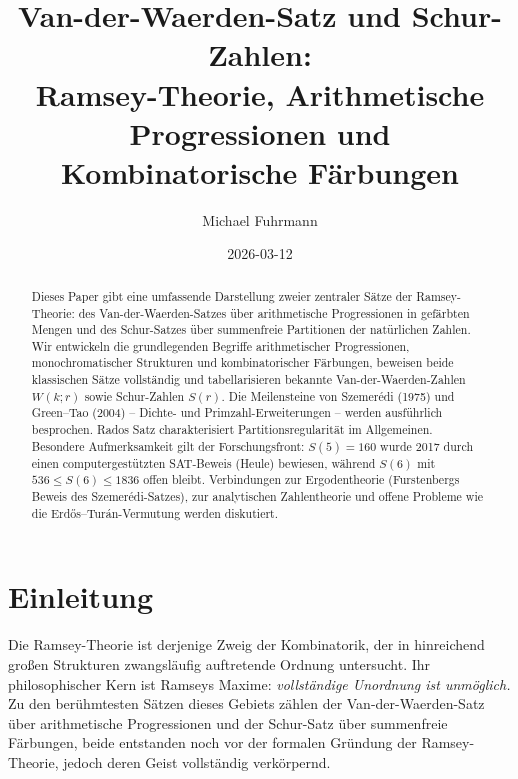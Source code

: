 \documentclass[12pt,a4paper]{amsart}
\theoremstyle{definition}
\begin{document}
\title{Van-der-Waerden-Satz und Schur-Zahlen:\\
Ramsey-Theorie, Arithmetische Progressionen und Kombinatorische Färbungen}

\author{Michael Fuhrmann}
\address{Specialist Mathematics Project, Build 145}
\date{2026-03-12}

\begin{abstract}
Dieses Paper gibt eine umfassende Darstellung zweier zentraler Sätze der Ramsey-Theorie:
des Van-der-Waerden-Satzes über arithmetische Progressionen in gefärbten Mengen und des
Schur-Satzes über summenfreie Partitionen der natürlichen Zahlen. Wir entwickeln die
grundlegenden Begriffe arithmetischer Progressionen, monochromatischer Strukturen und
kombinatorischer Färbungen, beweisen beide klassischen Sätze vollständig und tabellarisieren
bekannte Van-der-Waerden-Zahlen $W(k;r)$ sowie Schur-Zahlen $S(r)$. Die Meilensteine von
Szemerédi (1975) und Green--Tao (2004) -- Dichte- und Primzahl-Erweiterungen -- werden
ausführlich besprochen. Rados Satz charakterisiert Partitionsregularität im Allgemeinen.
Besondere Aufmerksamkeit gilt der Forschungsfront: $S(5) = 160$ wurde 2017 durch einen
computergestützten SAT-Beweis (Heule) bewiesen, während $S(6)$ mit $536 \leq S(6) \leq 1836$
offen bleibt. Verbindungen zur Ergodentheorie (Furstenbergs Beweis des Szemerédi-Satzes),
zur analytischen Zahlentheorie und offene Probleme wie die Erdős--Turán-Vermutung werden
diskutiert.
\end{abstract}

\maketitle

\tableofcontents

\section{Einleitung}

Die Ramsey-Theorie ist derjenige Zweig der Kombinatorik, der in hinreichend großen
Strukturen zwangsläufig auftretende Ordnung untersucht. Ihr philosophischer Kern ist
Ramseys Maxime: \emph{vollständige Unordnung ist unmöglich.} Zu den berühmtesten
Sätzen dieses Gebiets zählen der Van-der-Waerden-Satz über arithmetische Progressionen
und der Schur-Satz über summenfreie Färbungen, beide entstanden noch vor der formalen
Gründung der Ramsey-Theorie, jedoch deren Geist vollständig verkörpernd.
\end{document}
